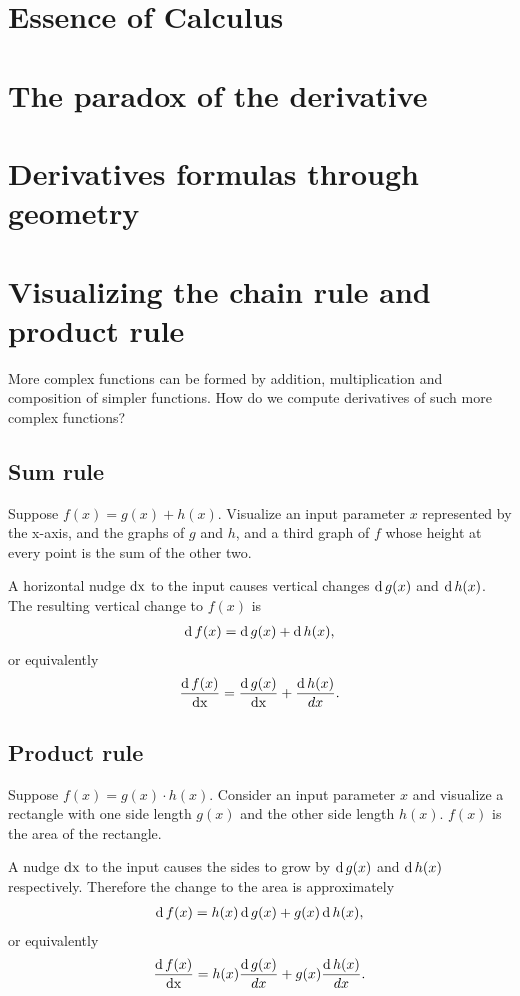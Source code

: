 \documentclass[12pt]{article}
\begin{document}
\section{Essence of Calculus}
\section{The paradox of the derivative}
\section{Derivatives formulas through geometry}
\section{Visualizing the chain rule and product rule}

More complex functions can be formed by addition, multiplication and
composition of simpler functions. How do we compute derivatives of such more
complex functions?

\subsection{Sum rule}
Suppose $f(x) = g(x) + h(x)$. Visualize an input parameter $x$ represented by
the x-axis, and the graphs of $g$ and $h$, and a third graph of $f$ whose
height at every point is the sum of the other two.

A horizontal nudge $\operatorname{\text{dx}}$ to the input causes vertical changes $\operatorname{\text{d}} g(x)$ and
$\operatorname{\text{d}} h(x)$. The resulting vertical change to $f(x)$ is
\begin{align*}
  \operatorname{\text{d}} f(x) = \operatorname{\text{d}} g(x) + \operatorname{\text{d}} h(x),
\end{align*}
or equivalently
\begin{align*}
  \frac{\operatorname{\text{d}} f(x)}{\operatorname{\text{dx}}} = \frac{\operatorname{\text{d}} g(x)}{\operatorname{\text{dx}}} + \frac{\operatorname{\text{d}} h(x)}{dx}.
\end{align*}


\newpage
\subsection{Product rule}
Suppose $f(x) = g(x) \cdot h(x)$. Consider an input parameter $x$ and visualize a
rectangle with one side length $g(x)$ and the other side length $h(x)$. $f(x)$
is the area of the rectangle.

A nudge $\operatorname{\text{dx}}$ to the input causes the sides to grow by $\operatorname{\text{d}} g(x)$ and $\operatorname{\text{d}} h(x)$
respectively. Therefore the change to the area is approximately
\begin{align*}
  \operatorname{\text{d}} f(x) = h(x) \operatorname{\text{d}} g(x) + g(x) \operatorname{\text{d}} h(x),
\end{align*}
or equivalently
\begin{align*}
  \frac{\operatorname{\text{d}} f(x)}{\operatorname{\text{dx}}} = h(x) \frac{\operatorname{\text{d}} g(x)}{dx} + g(x) \frac{\operatorname{\text{d}} h(x)}{dx}.
\end{align*}
\end{document}
